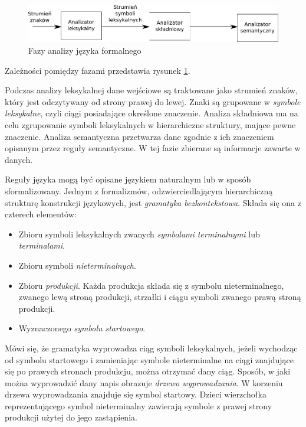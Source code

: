 \begin{figure}[h]
  \centering
    \includegraphics[width=\textwidth]{img/antlr_phases.pdf}
    \caption{Fazy analizy języka formalnego}
    \label{antlr_phases}
\end{figure}

Zależności pomiędzy fazami przedstawia rysunek \ref{antlr_phases}. 

Podczas analizy leksykalnej dane wejściowe są traktowane jako strumień znaków, który
jest odczytywany od strony prawej do lewej. Znaki są grupowane w \emph{symbole leksykalne}, czyli
ciągi posiadające określone znaczenie. Analiza składniowa ma na celu zgrupowanie 
symboli leksykalnych w hierarchiczne struktury,
mające pewne znaczenie. Analiza semantyczna przetwarza dane zgodnie z ich znaczeniem
opisanym przez reguły semantyczne. W tej fazie zbierane są informacje zawarte w danych.

Reguły języka mogą być opisane językiem naturalnym lub w sposób sformalizowany.
Jednym z formalizmów, odzwierciedlającym hierarchiczną strukturę konstrukcji językowych,
jest \emph{gramatyka bezkontekstowa}. Składa się ona z czterech elementów:

\begin{itemize}
\item Zbioru symboli leksykalnych zwanych \emph{symbolami terminalnymi} lub \emph{terminalami}.
\item Zbioru symboli \emph{nieterminalnych}.
\item Zbioru \emph{produkcji}. Każda produkcja składa się z symbolu nieterminalnego,
  zwanego lewą stroną produkcji, strzałki i ciągu symboli zwanego prawą stroną produkcji.
\item Wyznaczonego \emph{symbolu startowego}.
\end{itemize}

Mówi się, że gramatyka wyprowadza ciąg symboli leksykalnych, jeżeli wychodząc 
od symbolu startowego i zamieniając symbole nieterminalne na ciągi znajdujące 
się po prawych stronach produkcju, można otrzymać dany ciąg. Sposób, w jaki
można wyprowadzić dany napis obrazuje \emph{drzewo wyprowadzania}. W korzeniu drzewa wyprowadzania
znajduje się symbol startowy. Dzieci wierzchołka reprezentującego symbol nieterminalny
zawierają symbole z prawej strony produkcji użytej do jego zastąpienia.

